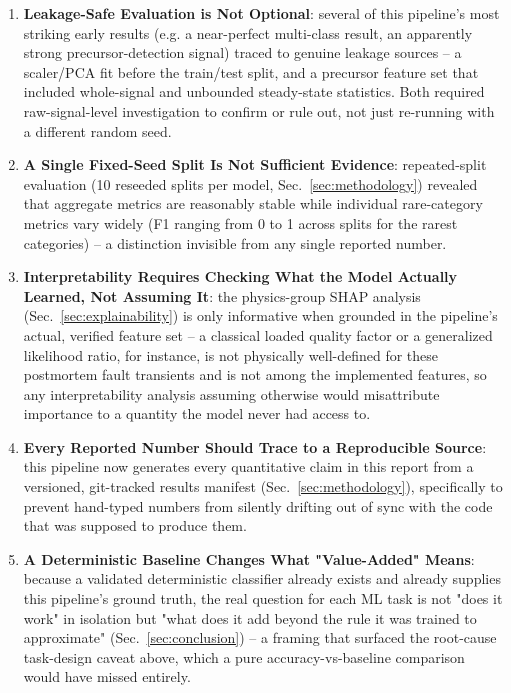 \begin{enumerate}
    \item \textbf{Leakage-Safe Evaluation is Not Optional}: several of this pipeline's most striking early results (e.g. a near-perfect multi-class result, an apparently strong precursor-detection signal) traced to genuine leakage sources -- a scaler/PCA fit before the train/test split, and a precursor feature set that included whole-signal and unbounded steady-state statistics. Both required raw-signal-level investigation to confirm or rule out, not just re-running with a different random seed.

    \item \textbf{A Single Fixed-Seed Split Is Not Sufficient Evidence}: repeated-split evaluation (10 reseeded splits per model, Sec.~\ref{sec:methodology}) revealed that aggregate metrics are reasonably stable while individual rare-category metrics vary widely (F1 ranging from 0 to 1 across splits for the rarest categories) -- a distinction invisible from any single reported number. %

    \item \textbf{Interpretability Requires Checking What the Model Actually Learned, Not Assuming It}: the physics-group SHAP analysis (Sec.~\ref{sec:explainability}) is only informative when grounded in the pipeline's actual, verified feature set -- a classical loaded quality factor or a generalized likelihood ratio, for instance, is not physically well-defined for these postmortem fault transients and is not among the implemented features, so any interpretability analysis assuming otherwise would misattribute importance to a quantity the model never had access to.

    \item \textbf{Every Reported Number Should Trace to a Reproducible Source}: this pipeline now generates every quantitative claim in this report from a versioned, git-tracked results manifest (Sec.~\ref{sec:methodology}), specifically to prevent hand-typed numbers from silently drifting out of sync with the code that was supposed to produce them.

    \item \textbf{A Deterministic Baseline Changes What "Value-Added" Means}: because a validated deterministic classifier already exists and already supplies this pipeline's ground truth, the real question for each ML task is not "does it work" in isolation but "what does it add beyond the rule it was trained to approximate" (Sec.~\ref{sec:conclusion}) -- a framing that surfaced the root-cause task-design caveat above, which a pure accuracy-vs-baseline comparison would have missed entirely.


\end{enumerate}
